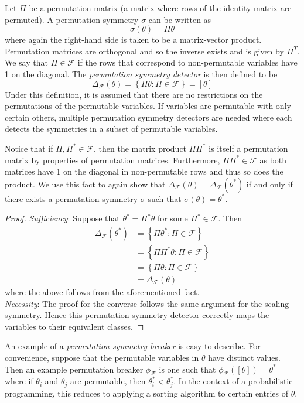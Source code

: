 \begin{defn}
Let $\Pi$ be a permutation matrix (a matrix where rows of the identity matrix are permuted). A permutation symmetry $\sigma$ can be written as
\[
\sigma(\theta)=\Pi\theta
\]
where again the right-hand side is taken to be a matrix-vector product. Permutation matrices are orthogonal and so the inverse exists and is given by $\Pi^T$. We say that $\Pi\in\mathcal{F}$ if the rows that correspond to non-permutable variables have 1 on the diagonal. The \textit{permutation symmetry detector} is then defined to be
\[
\Delta_\mathcal{F}(\theta) = \left\{\Pi\theta:\Pi\in\mathcal{F}\right\} = [\theta]
\]
Under this definition, it is assumed that there are no restrictions on the permutations of the permutable variables. If variables are permutable with only certain others, multiple permutation symmetry detectors are needed where each detects the symmetries in a subset of permutable variables.
\end{defn}

Notice that if $\Pi,\Pi^*\in\mathcal{F}$, then the matrix product $\Pi\Pi^*$ is itself a permutation matrix by properties of permutation matrices. Furthermore, $\Pi\Pi^*\in\mathcal{F}$ as both matrices have 1 on the diagonal in non-permutable rows and thus so does the product. We use this fact to again show that $\Delta_\mathcal{F}(\theta)=\Delta_\mathcal{F}(\theta^*)$ if and only if there exists a permutation symmetry $\sigma$ such that $\sigma(\theta)=\theta^*$.

\begin{proof}
\textit{Sufficiency}: Suppose that $\theta^*=\Pi^*\theta$ for some $\Pi^*\in\mathcal{F}$. Then
\begin{align*}
\Delta_\mathcal{F}(\theta^*) &= \left\{\Pi\theta^*:\Pi\in\mathcal{F}\right\} \\
&= \left\{\Pi\Pi^*\theta:\Pi\in\mathcal{F}\right\} \\
&= \left\{\Pi\theta:\Pi\in\mathcal{F}\right\} \\
&= \Delta_\mathcal{F}(\theta)
\end{align*}
where the above follows from the aforementioned fact.
\\

\noindent \textit{Necessity}: The proof for the converse follows the same argument for the scaling symmetry. Hence this permutation symmetry detector correctly maps the variables to their equivalent classes.
\end{proof}

An example of a \textit{permutation symmetry breaker} is easy to describe. For convenience, suppose that the permutable variables in $\theta$ have distinct values. Then an example permutation breaker $\phi_\mathcal{F}$ is one such that $\phi_\mathcal{F}([\theta])=\theta^*$ where if $\theta_i$ and $\theta_j$ are permutable, then $\theta^*_i<\theta^*_j$. In the context of a probabilistic programming, this reduces to applying a sorting algorithm to certain entries of $\theta$.

